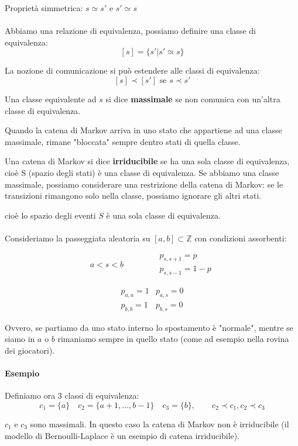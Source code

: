 \documentclass[a4paper,12pt]{book}
\begin{document}
Proprietà simmetrica: $ s \simeq s' $ e $ s' \simeq s $
\\
\\
Abbiamo una relazione di equivalenza, possiamo definire una classe di equivalenza:
$$ [s] = \{s' | s' \simeq s\} $$

La nozione di comunicazione si può estendere alle classi di equivalenza:
$$ [s] \prec [s'] \text{ se } s \prec s'$$

Una classe equivalente ad $ s $ si dice \textbf{massimale} se non comunica con un'altra classe di equivalenza. 

Quando la catena di Markov arriva in uno stato che appartiene ad una classe massimale, rimane "bloccata" sempre dentro stati di quella classe. 

Una catena di Markov si dice \textbf{irriducibile} se ha una sola classe di equivalenza, cioè S (spazio degli stati) è una classe di equivalenza.
Se abbiamo una classe massimale, possiamo considerare una restrizione della catena di Markov: se le transizioni rimangono solo nella classe, possiamo ignorare gli altri stati. 

cioè lo spazio degli eventi $ S $ è una sola classe di equivalenza.
\\
\\
Consideriamo la passeggiata aleatoria su $ [a,b] \subset \mathbb{Z} $ con condizioni assorbenti:

$$ a < s < b \qquad \qquad \begin{array}{c}
 	p_{s,s+1} = p \\
    p_{s,s-1} = 1-p
\end{array}$$

$$ \begin{array}{cc}
	p_{a,a} = 1 & p_{a,s} = 0 \\
	p_{b,b} = 1 & p_{b,s} = 0
\end{array}$$

Ovvero, se partiamo da uno stato interno lo spostamento è "normale", mentre se siamo in $ a $ o $ b $ rimaniamo sempre in quello stato (come ad esempio nella rovina dei giocatori). 

\paragraph{Esempio} Definiamo ora 3 classi di equivalenza:
$$ c_1 = \{a\} \quad c_2 = \{a+1, ..., b-1\} \quad c_3 = \{b\}, \qquad c_2 \prec c_1, c_2 \prec c_3$$ 

$ c_1 $ e $ c_3 $ sono massimali. In questo caso la catena di Markov non è irriducibile (il modello di Bernoulli-Laplace è un esempio di catena irriducibile). 
\end{document}
